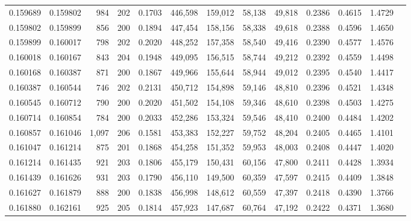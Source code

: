 \begin{tabular}{rrrrrrrrrrrrr}
0.159689 & 0.159802 &   984 & 202 &                                     0.1703 & 446,598 & 159,012 &  58,138 &  49,818 & 0.2386 & 0.4615 & 1.4729 \\
0.159802 & 0.159899 &   856 & 200 &                                     0.1894 & 447,454 & 158,156 &  58,338 &  49,618 & 0.2388 & 0.4596 & 1.4650 \\
0.159899 & 0.160017 &   798 & 202 &                                     0.2020 & 448,252 & 157,358 &  58,540 &  49,416 & 0.2390 & 0.4577 & 1.4576 \\
0.160018 & 0.160167 &   843 & 204 &                                     0.1948 & 449,095 & 156,515 &  58,744 &  49,212 & 0.2392 & 0.4559 & 1.4498 \\
0.160168 & 0.160387 &   871 & 200 &                                     0.1867 & 449,966 & 155,644 &  58,944 &  49,012 & 0.2395 & 0.4540 & 1.4417 \\
0.160387 & 0.160544 &   746 & 202 &                                     0.2131 & 450,712 & 154,898 &  59,146 &  48,810 & 0.2396 & 0.4521 & 1.4348 \\
0.160545 & 0.160712 &   790 & 200 &                                     0.2020 & 451,502 & 154,108 &  59,346 &  48,610 & 0.2398 & 0.4503 & 1.4275 \\
0.160714 & 0.160854 &   784 & 200 &                                     0.2033 & 452,286 & 153,324 &  59,546 &  48,410 & 0.2400 & 0.4484 & 1.4202 \\
0.160857 & 0.161046 & 1,097 & 206 &                                     0.1581 & 453,383 & 152,227 &  59,752 &  48,204 & 0.2405 & 0.4465 & 1.4101 \\
0.161047 & 0.161214 &   875 & 201 &                                     0.1868 & 454,258 & 151,352 &  59,953 &  48,003 & 0.2408 & 0.4447 & 1.4020 \\
0.161214 & 0.161435 &   921 & 203 &                                     0.1806 & 455,179 & 150,431 &  60,156 &  47,800 & 0.2411 & 0.4428 & 1.3934 \\
0.161439 & 0.161626 &   931 & 203 &                                     0.1790 & 456,110 & 149,500 &  60,359 &  47,597 & 0.2415 & 0.4409 & 1.3848 \\
0.161627 & 0.161879 &   888 & 200 &                                     0.1838 & 456,998 & 148,612 &  60,559 &  47,397 & 0.2418 & 0.4390 & 1.3766 \\
0.161880 & 0.162161 &   925 & 205 &                                     0.1814 & 457,923 & 147,687 &  60,764 &  47,192 & 0.2422 & 0.4371 & 1.3680 \\

\end{tabular}
